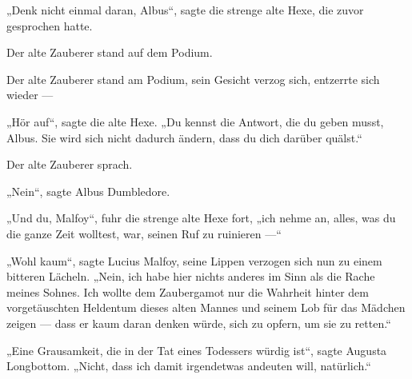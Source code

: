 „Denk nicht einmal daran, Albus“, sagte die strenge alte Hexe, die zuvor gesprochen hatte.

Der alte Zauberer stand auf dem Podium.

Der alte Zauberer stand am Podium, sein Gesicht verzog sich, entzerrte sich wieder —

„Hör auf“, sagte die alte Hexe.
„Du kennst die Antwort, die du geben musst, Albus. Sie wird sich nicht dadurch ändern, dass du dich darüber quälst.“

Der alte Zauberer sprach.

„Nein“, sagte Albus Dumbledore.

„Und du, Malfoy“, fuhr die strenge alte Hexe fort, „ich nehme an, alles, was du die ganze Zeit wolltest, war, seinen Ruf zu ruinieren —“

„Wohl kaum“, sagte Lucius Malfoy, seine Lippen verzogen sich nun zu einem bitteren Lächeln.
„Nein, ich habe hier nichts anderes im Sinn als die Rache meines Sohnes. Ich wollte dem Zaubergamot nur die Wahrheit hinter dem vorgetäuschten Heldentum dieses alten Mannes und seinem Lob für das Mädchen zeigen — dass er kaum daran denken würde, sich zu opfern, um sie zu retten.“

„Eine Grausamkeit, die in der Tat eines Todessers würdig ist“, sagte Augusta Longbottom.
„Nicht, dass ich damit irgendetwas andeuten will, natürlich.“

